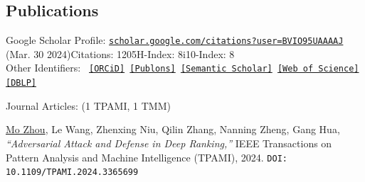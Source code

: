 \documentclass[10pt,margin,line,pifont,palatino,courier]{res}
\begin{document}
\begin{resume}



%


\section{\sc Publications}
	Google Scholar Profile:
	\href{https://scholar.google.com/citations?user=BVIO95UAAAAJ}{\small\texttt{scholar.google.com/citations?user=BVIO95UAAAAJ}}\\
	\hspace*{9.7em}(Mar. 30 2024)\qquad Citations: 1205\qquad H-Index: 8\qquad i10-Index: 8\\
	Other Identifiers:
	{\footnotesize\tt
	\href{https://orcid.org/0000-0003-3813-4875}{[ORCiD]}
	\href{https://publons.com/researcher/4930582/mo-zhou}{[Publons]}
	\href{https://www.semanticscholar.org/author/Mo-Zhou/2109097390}{[Semantic Scholar]}
	\href{https://www.webofscience.com/wos/author/record/AAC-2403-2022}{[Web of Science]}
    \href{https://dblp.org/pid/24/4846}{[DBLP]}
	}

{\sc Journal Articles:} \hfill(1 TPAMI, 1 TMM)\\

\begin{enumerate}[noitemsep, leftmargin=*, label={[J0{\arabic*}]}]

\item \underline{Mo Zhou},
\reversemarginpar{}
Le Wang, Zhenxing Niu, Qilin Zhang, Nanning Zheng, Gang Hua,
\textit{``Adversarial Attack and Defense in Deep Ranking,''}
IEEE Transactions on Pattern Analysis and Machine Intelligence (TPAMI), 2024.
\texttt{DOI: 10.1109/TPAMI.2024.3365699}


\end{enumerate}
\end{resume}
\end{document}
